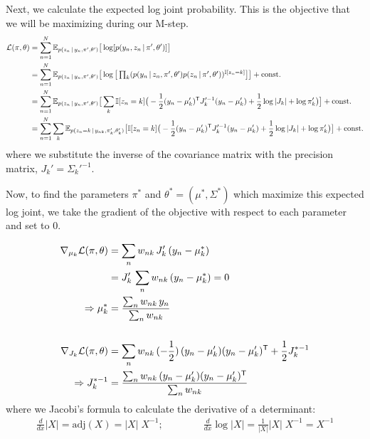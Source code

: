 \begin{enumerate}[label=(\alph*)]
\begin{solution}
Next, we calculate the expected log joint probability. This is the objective that we will be maximizing during our M-step.
\begin{align*}
    \mathcal{L}(\pi, \theta)
        &= \sum_{n=1}^N \mathbb{E}_{p(z_n \,|\, y_n, \pi', \theta')}
            \big[\log [p(y_n, z_n \,|\, \pi', \theta')]
            \big] \\
        &= \sum_{n=1}^N \mathbb{E}_{p(z_n \,|\, y_n, \pi', \theta')}
            \big[\log \big[\textstyle\prod_k (
                p(y_n \,|\, z_n, \pi', \theta') p(z_n \,|\, \pi', \theta')
                )^{\mathbb{I}[z_n = k]}\big]
            \big] + \textrm{const.}\\
        &= \sum_{n=1}^N \mathbb{E}_{p(z_n \,|\, y_n, \pi', \theta')}
            \big[\sum_k \mathbb{I}[z_n =k] \big(
                -\frac{1}{2}(y_n-\mu_k')^{\mathsf{T}} J_k'^{-1} (y_n-\mu_k')
                +\frac{1}{2}\log|J_k| + \log\pi_k'
            \big) \big] + \textrm{const.} \\
        &= \sum_{n=1}^N \sum_k
            \mathbb{E}_{p(z_n = k \,|\, y_{nk}, \pi_k', \theta_k')}
            \big[ \mathbb{I}[z_n =k] \big(
                -\frac{1}{2}(y_n-\mu_k')^{\mathsf{T}} J_k'^{-1} (y_n-\mu_k')
                +\frac{1}{2}\log|J_k| + \log\pi_k'
            \big) \big] + \textrm{const.}
\end{align*}
where we substitute the inverse of the covariance matrix with the precision matrix, $J_k'=\Sigma_k'^{-1}$.

Now, to find the parameters $\pi^*$ and $\theta^* = (\mu^*, \Sigma^*)$ which maximize this expected log joint, we take the gradient of the objective with respect to each parameter and set to 0.

\begin{align*}
    \nabla_{\mu_k} \mathcal{L}(\pi, \theta)
        &= \sum_n w_{nk}\, J_k'\,(y_n-\mu_k^*) \\
        &= J_k'\,\sum_n w_{nk}\, (y_n-\mu_k^*) = 0 \\
    \Rightarrow \mu_k^* &= \frac{\sum_n w_{nk}\,y_n}{\sum_n w_{nk}} \\
    &\\
    \nabla_{J_k} \mathcal{L}(\pi, \theta)
        &= \sum_n w_{nk}\, (-\frac{1}{2})\,(y_n-\mu_k')(y_n-\mu_k')^{\mathsf{T}}
            +\frac{1}{2} J_k^{*-1} \\
    \Rightarrow J_k^{*-1}
        &= \frac{\sum_n w_{nk}\,(y_n-\mu_k')(y_n-\mu_k')^{\mathsf{T}}}{\sum_n w_{nk}}
\end{align*}
where we Jacobi's formula to calculate the derivative of a determinant:
\begin{align*}
    \frac{d}{dx} |X|
        = \mathrm{adj}(X) = |X|\;X^{-1}; \qquad\qquad
    \frac{d}{dx} \log|X|
        = \frac{1}{|X|}|X|\;X^{-1} = X^{-1}
\end{align*}


\end{solution}
\end{enumerate}
